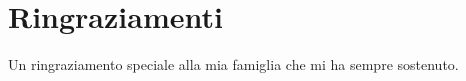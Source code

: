 

\chapter*{Ringraziamenti}
\thispagestyle{empty}
Un ringraziamento speciale alla mia famiglia che mi ha sempre sostenuto.
